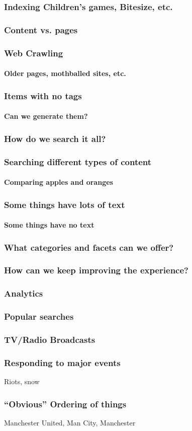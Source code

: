 \documentclass{beamer}
\begin{document}
\begin{frame}
  \frametitle{Indexing Children's games, Bitesize, etc.}
  \frametitle{Content vs. pages}
\end{frame}

\begin{frame}
  \frametitle{Web Crawling}
  \framesubtitle{Older pages, mothballed sites, etc.}
\end{frame}

\begin{frame}
  \frametitle{Items with no tags}
  \framesubtitle{Can we generate them?}
\end{frame}

\begin{frame}
  \frametitle{How do we search it all?}
\end{frame}

\begin{frame}
  \frametitle{Searching different types of content}
  \framesubtitle{Comparing apples and oranges}
\end{frame}

\begin{frame}
  \frametitle{Some things have lots of text}
  \framesubtitle{Some things have no text}
\end{frame}

\begin{frame}
  \frametitle{What categories and facets can we offer?}
\end{frame}

\begin{frame}
  \frametitle{How can we keep improving the experience?}
\end{frame}

\begin{frame}
  \frametitle{Analytics}
\end{frame}

\begin{frame}
  \frametitle{Popular searches}
\end{frame}

\begin{frame}
  \frametitle{TV/Radio Broadcasts}
\end{frame}

\begin{frame}
  \frametitle{Responding to major events}
  Riots, snow
\end{frame}

\begin{frame}
  \frametitle{``Obvious'' Ordering of things}
  Manchester United, Man City, Manchester
\end{frame}
\end{document}
